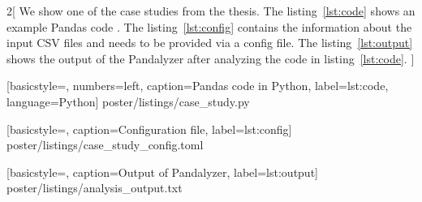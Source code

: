 \Large
\setlength{\columnsep}{20cm}
\begin{multicols}{2}[
We show one of the case studies from the thesis. The listing~\ref{lst:code} shows an example Pandas code .
The listing~\ref{lst:config} contains the information about the input CSV files and needs to be provided via a config file.
The listing~\ref{lst:output} shows the output of the Pandalyzer after analyzing the code in listing~\ref{lst:code}.
]





    [basicstyle=\normalsize\ttfamily, numbers=left, caption=Pandas code in Python, label={lst:code}, language=Python]
    {poster/listings/case_study.py}

\vfill\null
\columnbreak


    [basicstyle=\normalsize\ttfamily, caption=Configuration file, label={lst:config}]
    {poster/listings/case_study_config.toml}

    [basicstyle=\normalsize\ttfamily, caption=Output of Pandalyzer, label={lst:output}]
    {poster/listings/analysis_output.txt}

\end{multicols}